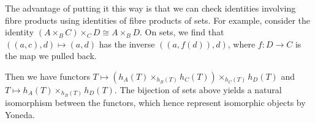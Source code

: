 The advantage of putting it this way is that we can check identities involving
fibre products using identities of fibre products of sets. For example, consider
the identity $(A\times_B C)\times_C D\cong A\times_B D$. On sets, we find
that $((a, c), d)\mapsto (a, d)$ has the inverse $((a, f(d)), d)$, where
$f\colon D\to C$ is the map we pulled back.

Then we have functors $T\mapsto (h_A(T)\times_{h_B(T)} h_C(T))\times_{h_C(T)} h_D(T)$
and $T\mapsto h_A(T)\times_{h_B(T)} h_D(T)$. The bijection of sets above
yields a natural isomorphism between the functors, which hence represent
isomorphic objects by Yoneda.
